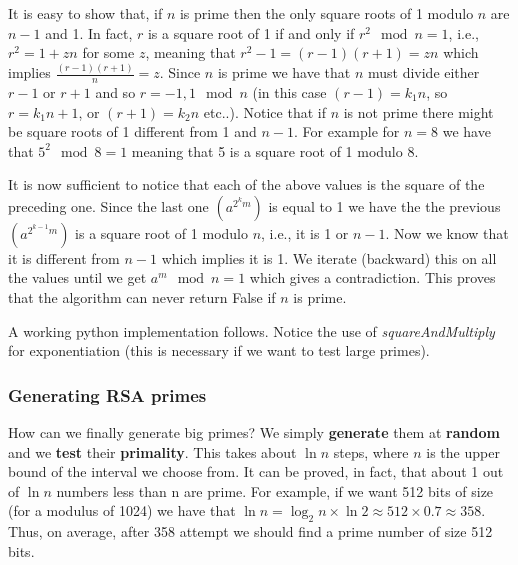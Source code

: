 It is easy to show that, if $n$ is prime then the only square roots of 1 modulo $n$ are $n-1$ and 1. In fact, $r$ is a square root of 1 if and only if $r^2 \mod n = 1$, i.e., $r^2 = 1 + zn$ for some $z$, meaning that $r^2 - 1 = (r-1)(r+1) = zn$ which implies $\frac{(r-1)(r+1)}{n} = z$. Since $n$ is prime we have that $n$ must divide either $r-1$ or $r+1$ and so $r = -1,1 \mod n$ (in this case $(r-1) = k_1 n$, so $r = k_1 n +1$, or $(r+1) = k_2 n $ etc..). Notice that if $n$ is not prime there might be square roots of 1 different from 1 and $n-1$. For example for $n=8$ we have that $5^2 \mod 8 = 1$ meaning that 5 is a square root of 1 modulo 8.

It is now sufficient to notice that each of the above values is the square of the preceding one. Since the last one $(a^{2^{k}m})$ is equal to 1 we have the the previous $(a^{2^{k-1}m})$ is a square root of 1 modulo $n$, i.e., it is 1 or $n-1$. Now we know that it is different from $n-1$ which implies it is 1. We iterate (backward) this on all the values until we get $a^m \mod n = 1$ which gives a contradiction. This proves that the algorithm can never return False if $n$ is prime.

A working python implementation follows. Notice the use of \textit{squareAndMultiply} for exponentiation (this is necessary if we want to test large primes).



\subsubsection{Generating RSA primes}
How can we finally generate big primes? We simply \textbf{generate} them at \textbf{random} and we \textbf{test} their \textbf{primality}. This takes about $\ln n$ steps, where $n$ is the upper bound of the interval we choose from. It can be proved, in fact, that about 1 out of $\ln n$ numbers less than n are prime. For example, if we want 512 bits of size (for a modulus of 1024) we have that $\ln n = \log_2 n \times \ln 2 \approx 512 \times 0.7 \approx 358$. Thus, on average, after 358 attempt we should find a prime number of size 512 bits.

